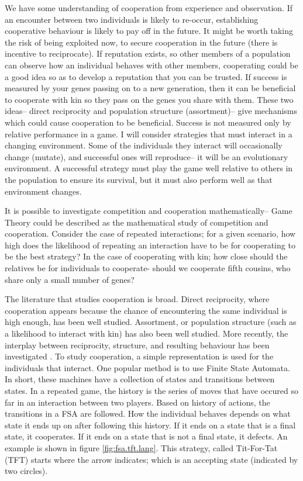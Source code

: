 \documentclass[a4paper,11pt,bcshonoursthesis,singlespace,twoside,thesisdraft,pdflatex]{cssethesis}
\renewcommand{\cite}{\citep} %
\begin{document}
We have some understanding of cooperation from experience and observation. 
If an encounter between two individuals is likely to re-occur, establishing cooperative behaviour is likely to pay off in the future. 
It might be worth taking the risk of being exploited now, to secure cooperation in the future (there is incentive to reciprocate). 
If reputation exists, so other members of a population can observe how an individual behaves with other members, cooperating could be a good idea so as to develop a reputation that you can be trusted. 
If success is measured by your genes passing on to a new generation, then it can be beneficial to cooperate with kin so they pass on the genes you share with them. 
These two ideas-- direct reciprocity and population structure (assortment)-- give mechanisms which could cause cooperation to be beneficial. 
Success is not measured only by relative performance in a game. 
I will consider strategies that must interact in a changing environment. 
Some of the individuals they interact will occasionally change (mutate), and successful ones will reproduce-- it will be an evolutionary environment. 
A successful strategy must play the game well relative to others in the population to ensure its survival, but it must also perform well as that environment changes.

It is possible to investigate competition and cooperation mathematically-- Game Theory could be described as the mathematical study of competition and cooperation. 
Consider the case of repeated interactions; for a given scenario, how high does the likelihood of repeating an interaction have to be for cooperating to be the best strategy? 
In the case of cooperating with kin; how close should the relatives be for individuals to cooperate- should we cooperate fifth cousins, who share only a small number of genes? 

The literature that studies cooperation is broad. Direct reciprocity, where cooperation appears because the chance of encountering the same individual is high enough, has been well studied. 
Assortment, or population structure (such as a likelihood to interact with kin) has also been well studied. 
More recently, the interplay between reciprocity, structure, and resulting behaviour has been investigated \cite{van-veelen:PNAS:2012}. 
To study cooperation, a simple representation is used for the individuals that interact. One popular method is to use Finite State Automata. 
In short, these machines have a collection of states and transitions between states. 
In a repeated game, the history is the series of moves that have occured so far in an interaction between two players. 
Based on history of actions, the transitions in a FSA are followed. 
How the individual behaves depends on what state it ends up on after following this history. 
If it ends on a state that is a final state, it cooperates. If it ends on a state that is not a final state, it defects. An example is shown in figure \ref{fig:fsa.tft.lang}. This strategy, called Tit-For-Tat (TFT) starts where the arrow indicates; which is an accepting state (indicated by two circles).
\end{document}
